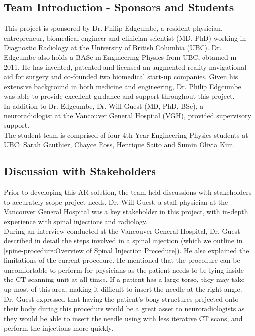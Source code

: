 \documentclass[12pt]{article}
\begin{document}
\subsection{Team Introduction - Sponsors and Students}

This project is sponsored by Dr. Philip Edgcumbe, a resident physician, entrepreneur, biomedical engineer and clinician-scientist (MD, PhD) working in Diagnostic Radiology at the University of British Columbia (UBC). Dr. Edgcumbe also holds a BASc in Engineering Physics from UBC, obtained in 2011. He has invented, patented and licensed an augmented reality navigational aid for surgery and co-founded two biomedical start-up companies. Given his extensive background in both medicine and engineering, Dr. Philip Edgcumbe was able to provide excellent guidance and support throughout this project.\\

In addition to Dr. Edgcumbe, Dr. Will Guest (MD, PhD, BSc), a neuroradiologist at the Vancouver General Hospital (VGH), provided supervisory support.\\

The student team is comprised of four 4th-Year Engineering Physics students at UBC: Sarah Gauthier, Chayce Ross, Henrique Saito and Sumin Olivia Kim. 

\subsection{Discussion with Stakeholders}
Prior to developing this AR solution, the team held discussions with stakeholders to accurately scope project needs. Dr. Will Guest, a staff physician at the Vancouver General Hospital was a key stakeholder in this project, with in-depth experience with spinal injections and radiology.\\

During an interview conducted at the Vancouver General Hospital, Dr. Guest described in detail the steps involved in a spinal injection (which we outline in \ref{spine-procedure:Overview of Spinal Injection Procedure}). He also explained the limitations of the current procedure. He mentioned that the procedure can be uncomfortable to perform for physicians as the patient needs to be lying inside the CT scanning unit at all times. If a patient has a large torso, they may take up most of this area, making it difficult to insert the needle at the right angle.\\ 

Dr. Guest expressed that having the patient's bony structures projected onto their body during this procedure would be a great asset to neuroradiologists as they would be able to insert the needle using with less iterative CT scans, and perform the injections more quickly.
\end{document}
